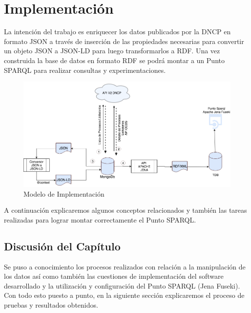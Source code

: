 \chapter{Implementación}
\label{chap:Implementación de la Ontologia}


La intención del trabajo es enriquecer los datos publicados por la DNCP en formato JSON a través de inserción de las propiedades necesarias para convertir un objeto JSON a JSON-LD para luego transformarlos a RDF. Una vez construida la base de datos en formato RDF se podrá montar a un Punto SPARQL para realizar consultas y experimentaciones.


\begin{figure}[h!]
   \centering
   \includegraphics[width=150mm]{figuras/Diagramas-Implementacion.png}

   \caption{Modelo de Implementación}
   \label{img:modelo de Implementacion}
\end{figure}

A continuación explicaremos algunos conceptos relacionados y también las tareas realizadas para lograr montar correctamente el Punto SPARQL.















 \section{Discusión del Capítulo }

 Se puso a conocimiento los procesos realizados con relación a la manipulación de los datos así como también las cuestiones de implementación del software desarrollado y la utilización y configuración del Punto SPARQL (Jena Fuseki). Con todo esto puesto a punto, en la siguiente sección explicaremos el proceso de pruebas y resultados obtenidos.



